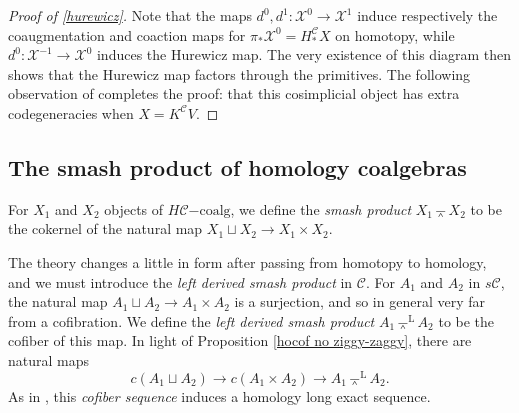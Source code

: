 \documentclass[11pt]{amsart} \renewcommand{\baselinestretch}{1.2}
\theoremstyle{plain}
\theoremstyle{definition}
\renewcommand{\to}{\longrightarrow}
\newcommand{\from}{\longleftarrow}
\newcommand{\calx}{\mathcal{X}}
\newcommand{\calc}{\mathcal{C}}
\newcommand{\citeBOX}[2][]{\cite[\mbox{#1}]{#2}}
\newcommand{\HC}[1]{H#1\mathrm{-coalg}}
\newcommand{\smashprod}{\barwedge}%
\newcommand{\Lsmashprod}{\barwedge^\mathrm{L}}%
\begin{document}
\begin{Pi-algebras and cohomology algebras}
\begin{proof}[Proof of \ref{hurewicz}]
Note that the maps $d^0,d^1:\calx^{0}\to\calx^{1}$ induce respectively the coaugmentation and coaction maps for $\pi_*\calx^{0}=H_*^{\calc}X$ on homotopy, while $d^0:\calx^{-1}\to\calx^{0}$ induces the Hurewicz map. The very existence of this diagram then shows that the  Hurewicz map factors through the primitives. The following observation of \citeBOX[\S4]{BlumRiehlResolutions.pdf} completes the proof: that this cosimplicial object has extra codegeneracies  when $X=K^\calc V$.
\end{proof}

\subsection{The smash product of homology coalgebras}\label{subseq:The smash product}
For $X_1$ and $X_2$ objects of  $\HC{\calc}$, we define the \emph{smash product} $X_1\smashprod X_2$ to be the cokernel of the natural map $X_1\sqcup X_2\to X_1\times X_2$. 

The theory changes a little in form after passing from homotopy to homology, and we must introduce the \emph{left derived smash product} in $\calc$. For $A_1$ and $A_2$ in $s\calc$, the natural map $A_1\sqcup A_2\to A_1\times A_2$ is a surjection, and so in general very far from a cofibration. We define the \emph{left derived smash product} $A_1\Lsmashprod A_2$ to be the cofiber of this map.
In light of Proposition \ref{hocof no ziggy-zaggy}, there are natural maps
\[c(A_1\sqcup A_2)\to c(A_1\times A_2)\to A_1\Lsmashprod A_2.\]
As in \cite[Proposition 4.6]{MR1089001}, this \emph{cofiber sequence} induces  a homology long exact sequence.
%
%


\end{Pi-algebras and cohomology algebras}
\end{document}
